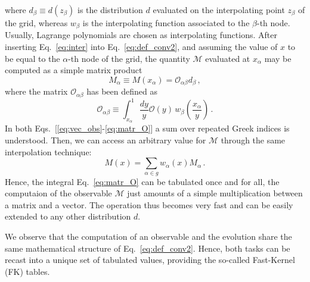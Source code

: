 where $d_{\beta} \equiv d(z_{\beta})$ is the distribution $d$ evaluated on the interpolating point $z_{\beta}$ of the grid, whereas $w_{\beta}$ is the interpolating function associated to the $\beta$-th node. Usually, Lagrange polynomials are chosen as interpolating functions. After inserting Eq.~\eqref{eq:inter} into Eq.~\eqref{eq:def_conv2}, and assuming the value of $x$ to be equal to the $\alpha$-th node of the grid, the quantity $\mathcal{M}$ evaluated at $x_{\alpha}$ may be computed as a simple matrix product
\begin{equation}
  M_{\alpha} \equiv M(x_{\alpha}) = \mathcal{O}_{\alpha \beta} d_{\beta} \,,
  \label{eq:vec_obs}
\end{equation}
where the matrix $\mathcal{O}_{\alpha \beta}$ has been defined as
\begin{equation}
  \mathcal{O}_{\alpha \beta} \equiv \int_{x_{\alpha}}^{1} \frac{dy}{y} \mathcal{O}(y) \, w_{\beta} \left( \frac{x_{\alpha}}{y}  \right) \,.
  \label{eq:matr_O}
\end{equation}
In both Eqs.~[\ref{eq:vec_obs}-\ref{eq:matr_O}] a sum over repeated Greek indices is understood. Then, we can access an arbitrary value for $\mathcal{M}$ through the same interpolation technique:
\begin{equation}
  M(x) = \sum_{\alpha \in g} w_{\alpha}(x) M_{\alpha} \,.
\end{equation}
Hence, the integral Eq.~\eqref{eq:matr_O} can be tabulated once and for all, the computaion of the observable $\mathcal{M}$ just amounts of a simple multiplication between a matrix and a vector. The operation thus becomes very fast and can be easily extended to any other distribution $d$.\par 
We observe that the computation of an observable and the evolution share the same mathematical structure of Eq.~\eqref{eq:def_conv2}. Hence, both tasks can be recast into a unique set of tabulated values, providing the so-called Fast-Kernel (FK) tables.

